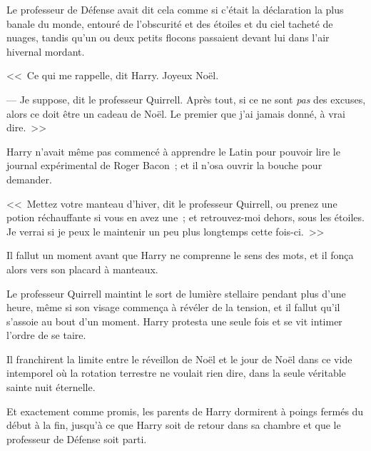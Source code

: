 Le professeur de Défense avait dit cela comme si c'était la déclaration la plus banale du monde, entouré de l'obscurité et des étoiles et du ciel tacheté de nuages, tandis qu'un ou deux petits flocons passaient devant lui dans l'air hivernal mordant.

<<~Ce qui me rappelle, dit Harry. Joyeux Noël.

--- Je suppose, dit le professeur Quirrell. Après tout, si ce ne sont \emph{pas} des excuses, alors ce doit être un cadeau de Noël. Le premier que j'ai jamais donné, à vrai dire.~>>

Harry n'avait même pas commencé à apprendre le Latin pour pouvoir lire le journal expérimental de Roger Bacon~; et il n'osa ouvrir la bouche pour demander.

<<~Mettez votre manteau d'hiver, dit le professeur Quirrell, ou prenez une potion réchauffante si vous en avez une~; et retrouvez-moi dehors, sous les étoiles. Je verrai si je peux le maintenir un peu plus longtemps cette fois-ci.~>>

Il fallut un moment avant que Harry ne comprenne le sens des mots, et il fonça alors vers son placard à manteaux.

Le professeur Quirrell maintint le sort de lumière stellaire pendant plus d'une heure, même si son visage commença à révéler de la tension, et il fallut qu'il s'assoie au bout d'un moment. Harry protesta une seule fois et se vit intimer l'ordre de se taire.

Il franchirent la limite entre le réveillon de Noël et le jour de Noël dans ce vide intemporel où la rotation terrestre ne voulait rien dire, dans la seule véritable sainte nuit éternelle.

Et exactement comme promis, les parents de Harry dormirent à poings fermés du début à la fin, jusqu'à ce que Harry soit de retour dans sa chambre et que le professeur de Défense soit parti.
